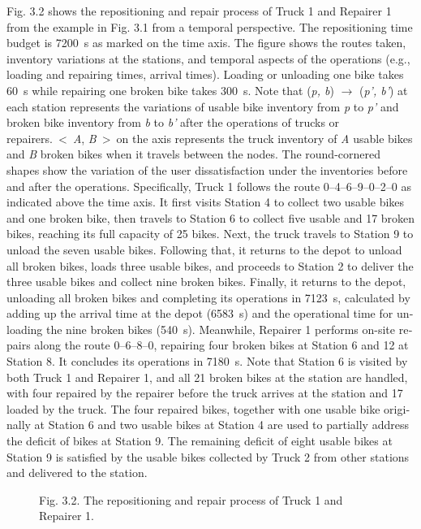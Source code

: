 \documentclass[
  english,
]{article}
\begin{document}
\begin{otherlanguage}{english}
\protect{}\label{p0180}
Fig. 3.2 shows the repositioning and repair process of Truck 1 and Repairer 1 from the example in
Fig. 3.1 from a temporal perspective. The repositioning time budget is 7200~s as marked on the time
axis. The figure shows the routes taken, inventory variations at the stations, and temporal aspects
of the operations (e.g., loading and repairing times, arrival times). Loading or unloading one bike
takes 60~s while repairing one broken bike takes 300~s. Note that (\emph{p, b}) \ensuremath{\rightarrow} (\emph{p', b'}) at
each station represents the variations of usable bike inventory from \emph{p} to \emph{p'} and
broken bike inventory from \emph{b} to \emph{b'} after the operations of trucks or
repairers.~\textless~\emph{A}, \emph{B}~\textgreater~on the axis represents the truck inventory of
\emph{A} usable bikes and \emph{B} broken bikes when it travels between the nodes. The
round-cornered shapes show the variation of the user dissatisfaction under the inventories before
and after the operations. Specifically, Truck 1 follows the route 0--4--6--9--0--2--0 as indicated
above the time axis. It first visits Station 4 to collect two usable bikes and one broken bike, then
travels to Station 6 to collect five usable and 17 broken bikes, reaching its full capacity of 25
bikes. Next, the truck travels to Station 9 to unload the seven usable bikes. Following that, it
returns to the depot to unload all broken bikes, loads three usable bikes, and proceeds to Station 2
to deliver the three usable bikes and collect nine broken bikes. Finally, it returns to the depot,
unloading all broken bikes and completing its operations in 7123~s, calculated by adding up the
arrival time at the depot (6583~s) and the operational time for unloading the nine broken bikes
(540~s). Meanwhile, Repairer 1 performs on-site repairs along the route 0--6--8--0, repairing four
broken bikes at Station 6 and 12 at Station 8. It concludes its operations in 7180~s. Note that
Station 6 is visited by both Truck 1 and Repairer 1, and all 21 broken bikes at the station are
handled, with four repaired by the repairer before the truck arrives at the station and 17 loaded by
the truck. The four repaired bikes, together with one usable bike originally at Station 6 and two
usable bikes at Station 4 are used to partially address the deficit of bikes at Station 9. The
remaining deficit of eight usable bikes at Station 9 is satisfied by the usable bikes collected by
Truck 2 from other stations and delivered to the station.

\begin{figure}
\centering
Fig. 3.2. The repositioning and repair process of Truck 1 and Repairer 1.
\caption{}\label{f0010}
\end{figure}


\end{otherlanguage}
\end{document}
